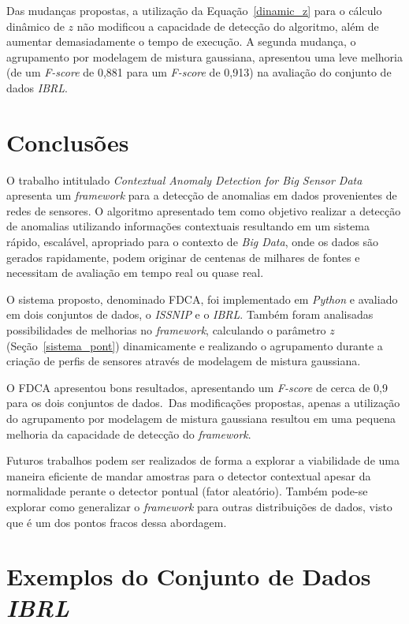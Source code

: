 \documentclass[cic,tc]{iiufrgs}
\begin{document}
Das mudanças propostas, a utilização da Equação~\ref{dinamic_z} para o cálculo dinâmico de $z$ não modificou a capacidade de detecção do algoritmo, além de aumentar demasiadamente o tempo de execução. A segunda mudança, o agrupamento por modelagem de mistura gaussiana, apresentou uma leve melhoria (de um \textit{F-score} de 0,881 para um \textit{F-score} de 0,913) na avaliação do conjunto de dados \textit{IBRL}.

\chapter{Conclusões}
\label{conclusao}
O trabalho intitulado \textit{Contextual Anomaly Detection for Big Sensor Data} \cite{ContextualMichael2014} apresenta um \textit{framework} para a detecção de anomalias em dados provenientes de redes de sensores. O algoritmo apresentado tem como objetivo realizar a detecção de anomalias utilizando informações contextuais resultando em um sistema rápido, escalável, apropriado para o contexto de \textit{Big Data}, onde os dados são gerados rapidamente, podem originar de centenas de milhares de fontes e necessitam de avaliação em tempo real ou quase real.

O sistema proposto, denominado FDCA, foi implementado em \textit{Python} e avaliado em dois conjuntos de dados, o \textit{ISSNIP} e o \textit{IBRL}. Também foram analisadas possibilidades de melhorias no \textit{framework}, calculando o parâmetro $z$ (Seção~\ref{sistema_pont}) dinamicamente e realizando o agrupamento durante a criação de perfis de sensores através de modelagem de mistura gaussiana.

O FDCA apresentou bons resultados, apresentando um \textit{F-score} de cerca de 0,9 para os dois conjuntos de dados.~Das modificações propostas, apenas a utilização do agrupamento por modelagem de mistura gaussiana resultou em uma pequena melhoria da capacidade de detecção do \textit{framework}.

Futuros trabalhos podem ser realizados de forma a explorar a viabilidade de uma maneira eficiente de mandar amostras para o detector contextual apesar da normalidade perante o detector pontual (fator aleatório). Também pode-se explorar como generalizar o \textit{framework} para outras distribuições de dados, visto que é um dos pontos fracos dessa abordagem.




\appendix
\chapter{Exemplos do Conjunto de Dados \textit{IBRL}}
\label{app_ibrl}
\end{document}
